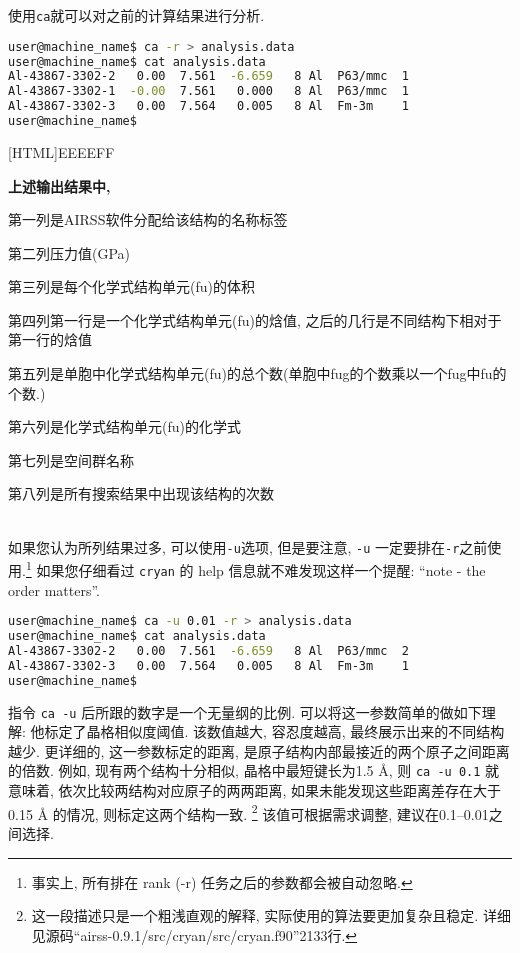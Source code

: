 \documentclass[a4paper, 10pt]{article}
\begin{document}
使用\verb|ca|就可以对之前的计算结果进行分析.
\begin{lstlisting}[language={bash}]
user@machine_name$ ca -r > analysis.data
user@machine_name$ cat analysis.data
Al-43867-3302-2   0.00  7.561  -6.659   8 Al  P63/mmc  1
Al-43867-3302-1  -0.00  7.561   0.000   8 Al  P63/mmc  1
Al-43867-3302-3   0.00  7.564   0.005   8 Al  Fm-3m    1
user@machine_name$
\end{lstlisting}

\noindent{}[HTML]{EEEEFF}{\parbox{\textwidth}{%
\noindent \textbf{上述输出结果中,}
\begin{maineu}
  \item 第一列是AIRSS软件分配给该结构的名称标签
  \item 第二列压力值(GPa)
  \item 第三列是每个化学式结构单元(fu)的体积
  \item 第四列第一行是一个化学式结构单元(fu)的焓值, 之后的几行是不同结构下相对于第一行的焓值
  \item 第五列是单胞中化学式结构单元(fu)的总个数(单胞中fug的个数乘以一个fug中fu的个数.)
  \item 第六列是化学式结构单元(fu)的化学式
  \item 第七列是空间群名称
  \item 第八列是所有搜索结果中出现该结构的次数
\end{maineu}}}\\

如果您认为所列结果过多, 可以使用\verb|-u|选项, 但是要注意, \verb|-u| 一定要排在\verb|-r|之前使用.\footnote{事实上, 所有排在 rank (-r) 任务之后的参数都会被自动忽略.} 如果您仔细看过 \verb|cryan| 的 help 信息就不难发现这样一个提醒: ``note - the order matters''.
\begin{lstlisting}[language={bash}]
user@machine_name$ ca -u 0.01 -r > analysis.data
user@machine_name$ cat analysis.data
Al-43867-3302-2   0.00  7.561  -6.659   8 Al  P63/mmc  2
Al-43867-3302-3   0.00  7.564   0.005   8 Al  Fm-3m    1
user@machine_name$
\end{lstlisting}

指令 \verb|ca -u| 后所跟的数字是一个无量纲的比例. 可以将这一参数简单的做如下理解:  他标定了晶格相似度阈值. 该数值越大, 容忍度越高, 最终展示出来的不同结构越少. 更详细的, 这一参数标定的距离, 是原子结构内部最接近的两个原子之间距离的倍数. 例如, 现有两个结构十分相似, 晶格中最短键长为1.5 \r{A}, 则 \verb|ca -u 0.1| 就意味着, 依次比较两结构对应原子的两两距离, 如果未能发现这些距离差存在大于0.15 \r{A} 的情况, 则标定这两个结构一致. \footnote{这一段描述只是一个粗浅直观的解释, 实际使用的算法要更加复杂且稳定. 详细见源码``airss-0.9.1/src/cryan/src/cryan.f90''2133行.} 该值可根据需求调整, 建议在0.1--0.01之间选择.
\end{document}
